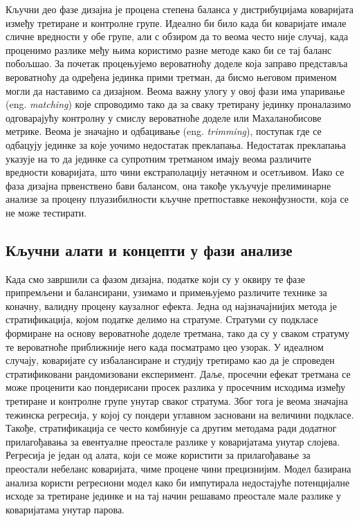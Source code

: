 \documentclass[12pt, a4paper]{article}
\begin{document}
Кључни део фазе дизајна је процена степена баланса у дистрибуцијама коваријата између третиране и контролне групе. Идеално би било када би коваријате имале сличне вредности у обе групе, али с обзиром да то веома често није случај, када проценимо разлике међу њима користимо разне методе како би се тај баланс побољшао. За почетак  процењујемо вероватноћу доделе која заправо представља вероватноћу да одређена јединка прими третман, да бисмо његовом применом могли да наставимо са дизајном. Веома важну улогу у овој фази има упаривање (eng. \textit{matching}) које спроводимо тако да за сваку третирану јединку проналазимо одговарајућу контролну у смислу вероватноће доделе или Махаланобисове метрике. Веома је значајно и одбацивање (eng. \textit{trimming}), поступак где се одбацују јединке за које уочимо недостатак преклапања. Недостатак преклапања указује на то да јединке са супротним третманом имају веома различите вредности коваријата, што чини екстраполацију нетачном и осетљивом. Иако се фаза дизајна првенствено бави балансом, она такође укључује прелиминарне анализе за процену плуазибилности кључне претпоставке неконфузности, која се не може тестирати.
\subsection*{Кључни алати и концепти у фази анализе}
Када смо завршили са фазом дизајна, податке који су у оквиру те фазе припремљени и балансирани, узимамо и примењујемо различите технике за коначну, валидну процену каузалног ефекта. Једна од најзначајнијих метода је стратификација, којом податке делимо на стратуме. Стратуми су подкласе формиране на основу вероватноће доделе третмана, тако да су у сваком стратуму те вероватноће приближније него када посматрамо цео узорак. У идеалном случају, коваријате су избалансиране и студију  третирамо као да је спроведен стратификовани рандомизовани експеримент. Даље, просечни ефекат третмана се може проценити као пондерисани просек разлика у просечним исходима између третиране и контролне групе унутар сваког стратума. Због тога је веома значајна тежинска регресија, у којој су пондери углавном засновани на величини подкласе. Такође, стратификација се често комбинује са другим методама ради додатног прилагођавања за евентуалне преостале разлике у коваријатама унутар слојева. Регресија је један од алата, који се може користити за прилагођавање за преостали небеланс коваријата, чиме процене чини прецизнијим. Модел базирана анализа користи регресиони модел како би импутирала недостајуће потенцијалне исходе за третиране јединке и на тај начин решавамо преостале мале разлике у коваријатама унутар парова.
\end{document}
